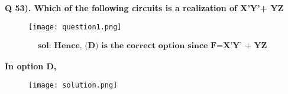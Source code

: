 \documentclass{article}
\begin{document}
\vspace{2em}
\textbf{Q 53). Which of the following circuits is a realization of X'Y'+ YZ}
\begin{figure}[h]
    \centering
    \texttt{[image: question1.png]}
\end{figure}

\begin{align}
\textbf{sol: Hence, (D) is the correct option since F=X'Y' + YZ }
\end{align}

\begin{center}
    \textbf{In option D,}
\end{center}

\begin{figure}[h]
    \centering
    \texttt{[image: solution.png]}
\end{figure}
\end{document}

